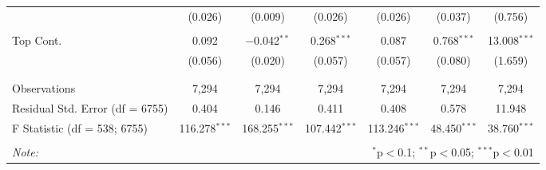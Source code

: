 \begin{table}[!htbp]
\begin{tabular}{@{\extracolsep{5pt}}lcccccc}
  & (0.026) & (0.009) & (0.026) & (0.026) & (0.037) & (0.756) \\ 
  & & & & & & \\ 
 Top Cont. & 0.092 & $-$0.042$^{**}$ & 0.268$^{***}$ & 0.087 & 0.768$^{***}$ & 13.008$^{***}$ \\ 
  & (0.056) & (0.020) & (0.057) & (0.057) & (0.080) & (1.659) \\ 
  & & & & & & \\ 
\hline \\[-1.8ex] 
Observations & 7,294 & 7,294 & 7,294 & 7,294 & 7,294 & 7,294 \\ 
Residual Std. Error (df = 6755) & 0.404 & 0.146 & 0.411 & 0.408 & 0.578 & 11.948 \\ 
F Statistic (df = 538; 6755) & 116.278$^{***}$ & 168.255$^{***}$ & 107.442$^{***}$ & 113.246$^{***}$ & 48.450$^{***}$ & 38.760$^{***}$ \\ 
\hline 
\hline \\[-1.8ex] 
\textit{Note:}  & \multicolumn{6}{r}{$^{*}$p$<$0.1; $^{**}$p$<$0.05; $^{***}$p$<$0.01} \\ 
\end{tabular} 
\end{table} 
